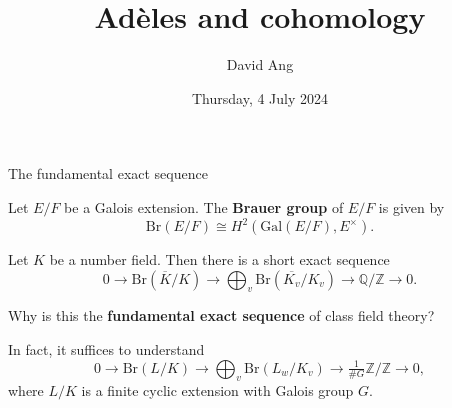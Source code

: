 \documentclass[10pt]{beamer}
\title{Ad\`eles and cohomology}
\author{David Ang}
\institute{Class field theory}
\date{Thursday, 4 July 2024}
\begin{document}
\frame{\titlepage}

\begin{frame}[t]{The fundamental exact sequence}

Let $ E / F $ be a Galois extension. The \textbf{Brauer group} of $ E / F $ is given by
$$ \mathrm{Br}(E / F) \cong H^2(\mathrm{Gal}(E / F), E^\times). $$

\pause

\begin{theorem}
Let $ K $ be a number field. Then there is a short exact sequence
$$ 0 \to \mathrm{Br}(\overline{K} / K) \to \bigoplus_v \mathrm{Br}(\overline{K_v} / K_v) \to \mathbb{Q} / \mathbb{Z} \to 0. $$
\end{theorem}

\pause

Why is this the \textbf{fundamental exact sequence} of class field theory?

\pause

\vspace{0.5cm} In fact, it suffices to understand
$$ 0 \to \mathrm{Br}(L / K) \to \bigoplus_v \mathrm{Br}(L_w / K_v) \to \tfrac{1}{\#G}\mathbb{Z} / \mathbb{Z} \to 0, $$
where $ L / K $ is a finite cyclic extension with Galois group $ G $.

\end{frame}
\end{document}
